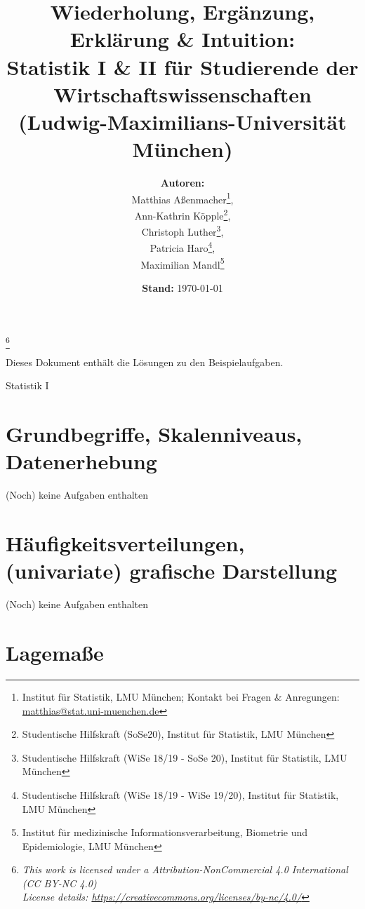 \documentclass[a4paper]{article}
\title{%
  \large Wiederholung, Ergänzung, Erklärung \& Intuition:\\
  \Large Statistik I \& II für Studierende der Wirtschaftswissenschaften\\
  \large (Ludwig-Maximilians-Universität München)
}
\date{\textbf{Stand:} \today}
\author{\textbf{Autoren:}\\ 
Matthias Aßenmacher\thanks{Institut für Statistik, LMU München; Kontakt bei Fragen \& Anregungen: \url{matthias@stat.uni-muenchen.de}},\\
Ann-Kathrin Köpple\thanks{Studentische Hilfskraft (SoSe20), Institut für Statistik, LMU München},\\
Christoph Luther\thanks{Studentische Hilfskraft (WiSe 18/19 - SoSe 20), Institut für Statistik, LMU München},\\
Patricia Haro\thanks{Studentische Hilfskraft (WiSe 18/19 - WiSe 19/20), Institut für Statistik, LMU München},\\
Maximilian Mandl\thanks{Institut für medizinische Informationsverarbeitung, Biometrie und Epidemiologie, LMU München\vspace{.25cm}}}
\newcommand\blfootnote[1]{%
  \begingroup
  \renewcommand\thefootnote{}\footnote{#1}%
  \addtocounter{footnote}{-1}%
  \endgroup
}
\begin{document}
\maketitle

\blfootnote{
\hspace{-0.75cm} 
\textit{\small 
This work is licensed under a Attribution-NonCommercial 4.0 International (CC BY-NC 4.0)\\          
License details: \url{https://creativecommons.org/licenses/by-nc/4.0/}}
}

\noindent Dieses Dokument enthält die Lösungen zu den Beispielaufgaben.

\clearpage

\tableofcontents

\clearpage

\hspace{0pt}
\vfill
\begin{center}
    {\Huge Statistik I}
\end{center}
\vfill
\hspace{0pt}

\clearpage


\section{Grundbegriffe, Skalenniveaus, Datenerhebung}

\noindent (Noch) keine Aufgaben enthalten

\clearpage


\section{Häufigkeitsverteilungen, (univariate) grafische Darstellung}

\noindent (Noch) keine Aufgaben enthalten

\clearpage


\section{Lagemaße}
\end{document}
